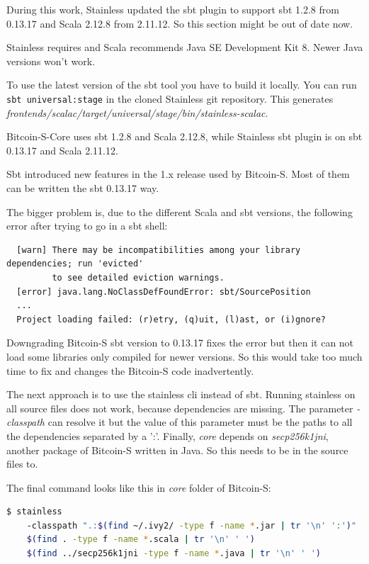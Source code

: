 \documentclass[runningheads]{llncs}
\begin{document}
During this work, Stainless updated the sbt plugin to support sbt
1.2.8 from 0.13.17 and Scala 2.12.8 from 2.11.12.  So this section
might be out of date now.

Stainless requires and Scala recommends Java SE Development Kit 8.
Newer Java versions won't work.

To use the latest version of the sbt tool you have to build it
locally.  You can run \texttt{sbt universal:stage} in the cloned
Stainless git repository.  This generates
\emph{frontends/scalac/target/universal/stage/bin/stainless-scalac}.

Bitcoin-S-Core uses sbt 1.2.8 and Scala 2.12.8, while Stainless sbt
plugin is on sbt 0.13.17 and Scala 2.11.12.

Sbt introduced new features in the 1.x release used by Bitcoin-S.
Most of them can be written the sbt 0.13.17 way.

The bigger problem is, due to the different Scala and sbt versions,
the following error after trying to go in a sbt shell:
\begin{verbatim}
  [warn] There may be incompatibilities among your library dependencies; run 'evicted'
         to see detailed eviction warnings.
  [error] java.lang.NoClassDefFoundError: sbt/SourcePosition
  ...
  Project loading failed: (r)etry, (q)uit, (l)ast, or (i)gnore?
\end{verbatim}

Downgrading Bitcoin-S sbt version to 0.13.17 fixes the error but then
it can not load some libraries only compiled for newer versions.  So
this would take too much time to fix and changes the Bitcoin-S code
inadvertently.

The next approach is to use the stainless cli instead of sbt.  Running
stainless on all source files does not work, because dependencies are
missing.  The parameter \emph{-classpath} can resolve it but the value
of this parameter must be the paths to all the dependencies separated
by a ':'.  Finally, \emph{core} depends on \emph{secp256k1jni},
another package of Bitcoin-S written in Java.  So this needs to be in
the source files to.

The final command looks like this in \emph{core} folder of Bitcoin-S:
\begin{lstlisting}[language=bash]
  $ stainless
    -classpath ".:$(find ~/.ivy2/ -type f -name *.jar | tr '\n' ':')"
    $(find . -type f -name *.scala | tr '\n' ' ')
    $(find ../secp256k1jni -type f -name *.java | tr '\n' ' ')
\end{lstlisting}
\end{document}
